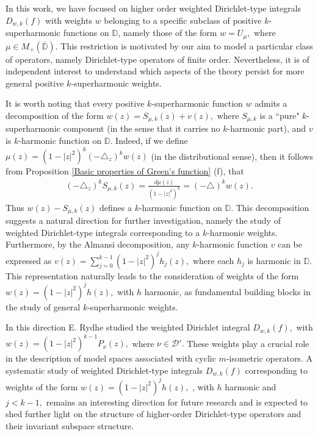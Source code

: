 \documentclass[10pt,oneside,reqno]{amsart}
\theoremstyle{definition}
\theoremstyle{remark}
\newcommand{\D}{\mathbb D}
\numberwithin{equation}{section}
\begin{document}
In this work, we have focused on higher order weighted Dirichlet-type integrals $D_{w,k}(f)$ with weights $w$ belonging to a specific subclass of positive $k$-superharmonic functions on $\D$, namely those of the form $w=U_{\mu},$ where $\mu\in M_+(\overline{\D}).$ This restriction is motivated by our aim to model a particular class of operators, namely Dirichlet-type operators of finite order. Nevertheless, it is of independent interest to understand which aspects of the theory persist for more general positive $k$-superharmonic weights. 

It is worth noting that every positive $k$-superharmonic function $w$ admits a decomposition of the form $w(z) = S_{\mu,k}(z) + v(z),$  where $S_{\mu,k}$ is a ``pure" $k$-superharmonic component (in the sense that it carries no $k$-harmonic part), and $v$ is $k$-harmonic function on $\D$. Indeed, if we define $\mu(z)= (1-|z|^2)^k (-\triangle_z)^k w(z)$ (in the distributional sense), then it follows from Proposition \ref{Basic properties of Green's function} (f), that 
\begin{align*}
   (-\triangle_z)^k S_{\mu,k}(z)= \frac{d\mu(z)}{(1-|z|^2)^k}= (-\triangle)^k w(z). 
\end{align*}
Thus $w(z)-S_{\mu,k}(z)$ defines a $k$-harmonic function on $\D.$ This decomposition suggests a natural direction for further investigation, namely the study of weighted Dirichlet-type integrals corresponding to a $k$-harmonic weights. Furthermore, by the Almansi decomposition, any $k$-harmonic function $v$ can be expressed as $v(z) = \sum_{j=0}^{k-1} (1-|z|^2)^j h_j(z),$
where each $h_j$ is harmonic in $\mathbb{D}.$ This representation naturally leads to the consideration of weights of the form
$w(z) = (1-|z|^2)^j h(z),$ with $h$ harmonic, as fundamental building blocks in the study of general $k$-superharmonic weights.

In this direction E. Rydhe \cite[Sec. 5]{Rydhe19} studied the weighted Dirichlet integral $D_{w,k}(f),$ with $w(z)=(1-|z|^2)^{k-1}P_{\nu}(z),$ where $\nu\in \mathcal D'.$ These weights play a crucial role in the description of model spaces associated with cyclic $m$-isometric operators. A systematic study of weighted Dirichlet-type integrals $D_{w,k}(f)$ corresponding to weights of the form $w(z) = (1-|z|^2)^j h(z),$ , with $h$ harmonic and $j<k-1,$ remains an interesting direction for future research and is expected to shed further light on the structure of higher-order Dirichlet-type operators and their invariant subspace structure. 
\end{document}
